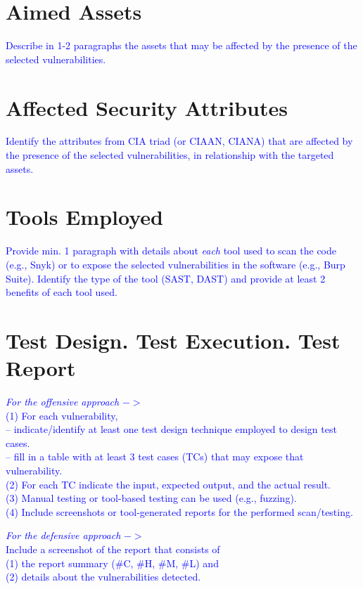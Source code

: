 \documentclass{article}
\begin{document}
\section{Aimed Assets}
\label{}

\textcolor{blue}{Describe in 1-2 paragraphs the assets that may be affected by the presence of the selected vulnerabilities.
}

\section{Affected Security Attributes}
\label{}

\textcolor{blue}{Identify the attributes from CIA triad (or CIAAN, CIANA) that are affected by the presence of the selected vulnerabilities, in relationship with the targeted assets.
}


\section{Tools Employed}
\label{}

\textcolor{blue}{Provide min. 1 paragraph with details about \textit{each} tool used to scan the code (e.g., Snyk) or to expose the selected vulnerabilities in the software (e.g., Burp Suite).
    Identify the type of the tool (SAST, DAST) and provide at least 2 benefits of each tool used.
}


\section{Test Design. Test Execution. Test Report}
\label{}

\textcolor{blue}{\textit{For the offensive approach} $->$\\
    (1) For each vulnerability, \\
    -- indicate/identify at least one test design technique employed to design test cases.\\
    -- fill in a table with at least 3 test cases (TCs) that may expose that vulnerability.\\
    (2) For each TC indicate the input, expected output, and the actual result.\\
    (3) Manual testing or tool-based testing can be used (e.g., fuzzing).\\
    (4) Include screenshots or tool-generated reports for the performed scan/testing.}

\textcolor{blue}{\textit{For the defensive approach} $->$\\
    Include a screenshot of the report that consists of \\
    (1) the report summary (\#C, \#H, \#M, \#L) and \\
    (2) details about the vulnerabilities detected.}
\end{document}
